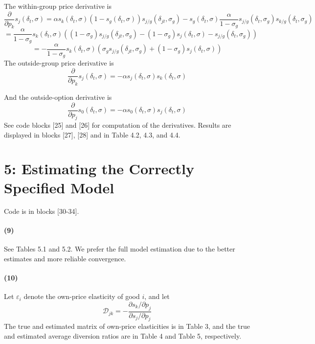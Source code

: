 \documentclass[10pt,letter]{article}
\begin{document}
The within-group price derivative is
\[ \frac{\partial }{\partial p_k}s_j(\delta_t, \sigma) = \alpha s_k(\delta_t, \sigma)(1-s_g(\delta_t, \sigma))s_{j/ g}(\delta_{jt}, \sigma_g)  - s_{g}(\delta_t, \sigma)\frac{\alpha}{1-\sigma_g} s_{j/ g}(\delta_{t}, \sigma_g)s_{k / g}(\delta_{t}, \sigma_g)\]
\[= \frac{\alpha}{1-\sigma_g} s_k(\delta_t, \sigma)\left( (1-\sigma_g)s_{j/ g}(\delta_{jt}, \sigma_g)-(1-\sigma_g)s_j(\delta_t, \sigma)  -  s_{j/ g}(\delta_{t}, \sigma_g)\right)\]
\[= - \frac{\alpha}{1-\sigma_g} s_k(\delta_t, \sigma)\left( \sigma_g s_{j/ g}(\delta_{jt}, \sigma_g)+ (1-\sigma_g)s_j(\delta_t, \sigma)  \right)\]
The outside-group price derivative is
\[\frac{\partial }{\partial p_k}s_j(\delta_t, \sigma) =- \alpha s_{j}(\delta_t, \sigma)s_{k}(\delta_t, \sigma) \]

And the outside-option derivative is
\[ \frac{\partial}{\partial p_j} s_0(\delta_t, \sigma) = - \alpha s_0(\delta_t, \sigma) s_j(\delta_t, \sigma)\]
See code blocks [25] and [26] for computation of the derivatives. Results are displayed in blocks [27], [28] and in Table 4.2, 4.3, and 4.4.






\clearpage
\section*{5: Estimating the Correctly Specified Model}
Code is in blocks [30-34].

\paragraph{(9)} See Tables 5.1 and 5.2. We prefer the full model estimation due to the better estimates and more reliable convergence.

\paragraph{(10)} Let $\varepsilon_i$ denote the own-price elasticity of good $i$, and let\[ \mathcal{D}_{jk}  = - \frac{\partial s_{k} / \partial p_j}{\partial s_j / \partial p_j} \] The true and estimated matrix of own-price elasticities is in Table 3, and the true and estimated average diversion ratios are in Table 4 and Table 5, respectively.
\clearpage





\end{document}
